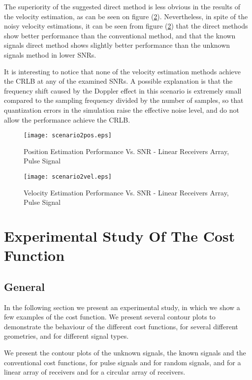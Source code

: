 The superiority of the suggested direct method is less obvious in the results of the velocity estimation, as can be seen on figure (\ref{fig:scenario2_vel_rms}). Nevertheless, in spite of the noisy velocity estimations, it can be seen from figure (\ref{fig:scenario2_vel_rms}) that the direct methods show better performance than the conventional method, and that the known signals direct method shows slightly better performance than the unknown signals method in lower SNRs.

It is interesting to notice that none of the velocity estimation methods achieve the CRLB at any of the examined SNRs. A possible explanation is that the frequency shift caused by the Doppler effect in this scenario is extremely small compared to the sampling frequency divided by the number of samples, so that quantization errors in the simulation raise the effective noise level, and do not allow the performance achieve the CRLB.

\begin{figure}
\begin{center}
\texttt{[image: scenario2pos.eps]} 
\end{center}
\caption{Position Estimation Performance Vs. SNR - Linear Receivers Array, Pulse Signal}
\label{fig:scenario2_pos_rms}
\end{figure}

\begin{figure}
\begin{center}
\texttt{[image: scenario2vel.eps]} 
\end{center}
\caption{Velocity Estimation Performance Vs. SNR - Linear Receivers Array, Pulse Signal}
\label{fig:scenario2_vel_rms}
\end{figure}

\section{Experimental Study Of The Cost Function}
\label{sec:experimental_study}
\subsection{General}
In the following section we present an experimental study, in which we show a few examples of the cost function. We present several contour plots to demonstrate the behaviour of the different cost functions, for several different geometries, and for different signal types.

We present the contour plots of the unknown signals, the known signals and the conventional cost functions, for pulse signals and for random signals, and for a linear array of receivers and for a circular array of receivers.

